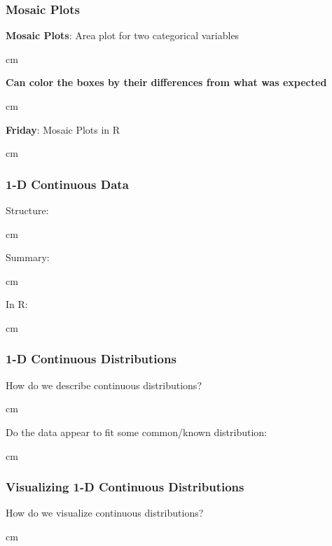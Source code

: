 \documentclass{beamer} %
\begin{document}
\begin{frame}\frametitle{Mosaic Plots}
	\small
	
	\textbf{Mosaic Plots}:  Area plot for two categorical variables%
	
	 cm
	
	\textbf{Can color the boxes by their differences from what was expected}  %
	
	 cm
	
	\textbf{Friday}:  Mosaic Plots in R%
	
	 cm
	
\end{frame}





\begin{frame}\frametitle{1-D Continuous Data}
	\small
	Structure:
	
	 cm
	
	Summary:
	
	 cm
	
	In R:  
	
	 cm
	
\end{frame}




\begin{frame}\frametitle{1-D Continuous Distributions}
	\small
	How do we describe continuous distributions?
	
	 cm
	
	Do the data appear to fit some common/known distribution:
	
	 cm
	
\end{frame}





\begin{frame}\frametitle{Visualizing 1-D Continuous Distributions}
	\small
	How do we visualize continuous distributions?
	
	 cm
	
\end{frame}
\end{document}
